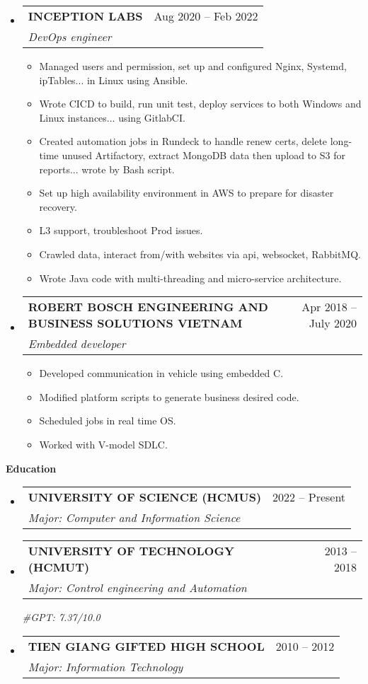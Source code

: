\documentclass[letterpaper,12pt]{article}[leftmargin=*]
\makeatletter
\def \entryspacing {5pt}
\renewcommand{\section}[2]{\vspace{5pt}
  \colorbox{secondary}{\color{white}\raggedbottom\normalsize\textbf{{#1}{\hspace{7pt}#2}}}
}
\newcommand{\resumeEntryStart}{\begin{itemize}[leftmargin=2.5mm]}
\newcommand{\resumeEntryEnd}{\end{itemize}\vspace{\entryspacing}}
\newcommand{\resumeItemListStart}{\begin{itemize}[leftmargin=4.5mm]}
\newcommand{\resumeItemListEnd}{\end{itemize}}
\newcommand{\resumeItem}[1]{
  \item\small{
    {#1 \vspace{-2pt}}
  }
}
\newcommand{\resumeEntryTSDL}[4]{
  \vspace{-1pt}\item[]
    \begin{tabularx}{0.97\textwidth}{X@{\hspace{60pt}}r}
      \textbf{\color{primary}#1} & {\firabook\color{accent}\small#2} \\
      \textit{\color{accent}\small#3} & {\firabook\color{accent}\small#4} \\
    \end{tabularx}\vspace{-6pt}
}
\makeatother
\begin{document}
\newpage
  \resumeEntryStart
    \resumeEntryTSDL
      {INCEPTION LABS}{Aug 2020 -- Feb 2022}
      {DevOps engineer}{}
    \resumeItemListStart
      \resumeItem {Managed users and permission, set up and configured Nginx, Systemd, ipTables... in Linux using Ansible.}
      \resumeItem {Wrote CICD to build, run unit test, deploy services to both Windows and Linux instances... using GitlabCI.}
      \resumeItem {Created automation jobs in Rundeck to handle renew certs, delete long-time unused Artifactory, extract MongoDB data then upload to S3 for reports... wrote by Bash script.}
      \resumeItem {Set up high availability environment in AWS to prepare for disaster recovery.}
      \resumeItem {L3 support, troubleshoot Prod issues.}
      \resumeItem {Crawled data, interact from/with websites via api, websocket, RabbitMQ.}
      \resumeItem {Wrote Java code with multi-threading and micro-service architecture.}
    \resumeItemListEnd
  \resumeEntryEnd


  \resumeEntryStart
    \resumeEntryTSDL
      {ROBERT BOSCH ENGINEERING AND BUSINESS SOLUTIONS VIETNAM}{Apr 2018 -- July 2020}
      {Embedded developer}{}
    \resumeItemListStart
      \resumeItem {Developed communication in vehicle using embedded C.}
      \vspace{1pt}\small{
      }\vspace{-1pt}
      \resumeItem {Modified platform scripts to generate business desired code.}
      \resumeItem {Scheduled jobs in real time OS.}
      \resumeItem {Worked with V-model SDLC.}
    \resumeItemListEnd
  \resumeEntryEnd

\section{\faGraduationCap}{Education}
  \resumeEntryStart
    \resumeEntryTSDL
      {UNIVERSITY OF SCIENCE (HCMUS)}{2022 -- Present}
      {Major: Computer and Information Science}{}
    \resumeEntryTSDL
      {UNIVERSITY OF TECHNOLOGY (HCMUT)}{2013 -- 2018}
      {Major: Control engineering and Automation}{\vspace{5pt}}
      \textit{\color{accent}\small#GPT: 7.37/10.0}
    \resumeEntryTSDL
      {TIEN GIANG GIFTED HIGH SCHOOL}{2010 -- 2012}
      {Major: Information Technology}{}
\resumeEntryEnd
\end{document}
